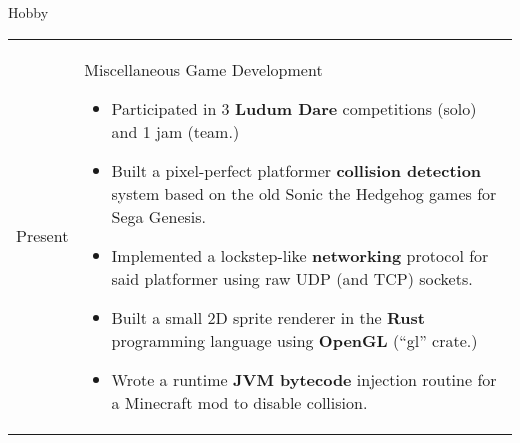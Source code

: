 \documentclass[12pt]{article}
\renewcommand{\section}[1]{{\Huge{#1}}\vspace{2 mm}}
\newenvironment{timeline}
        {\begin{tabular}{p{21 mm}|p{150 mm}}}
        {\end{tabular}}
\newenvironment{timelinetitle}
        {\vspace{-2 mm}\begin{large}}
        {\end{large}\vspace{-1.5 mm}}
\newcommand{\timespan}[2]{{#2}\newline{#1}}
\begin{document}
\vspace{3.0 mm}
\section{Hobby}
\hline

\begin{timeline}
\timespan{2011}{Present}
&
\begin{timelinetitle}
    Miscellaneous Game Development
\end{timelinetitle}
\begin{itemize}
  \item Participated in 3 \textbf{Ludum Dare} competitions (solo) and 1 jam (team.)

  \item Built a pixel-perfect platformer \textbf{collision detection} system based on
        the old Sonic the Hedgehog games for Sega Genesis.

  \item Implemented a lockstep-like \textbf{networking} protocol for said platformer
        using raw UDP (and TCP) sockets.

  \item Built a small 2D sprite renderer in the \textbf{Rust} programming language using
        \textbf{OpenGL} (``gl'' crate.)

  \item Wrote a runtime \textbf{JVM bytecode} injection routine for a Minecraft mod to disable
        collision.
\end{itemize}

\end{timeline}
\end{document}
